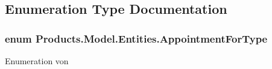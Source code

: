 \subsection{Enumeration Type Documentation}
\subsubsection[{\texorpdfstring{Appointment\+For\+Type}{AppointmentForType}}]{\setlength{\rightskip}{0pt plus 5cm}enum {\bf Products.\+Model.\+Entities.\+Appointment\+For\+Type}\hspace{0.3cm}{\ttfamily [strong]}}\hypertarget{namespace_products_1_1_model_1_1_entities_aefe1aa1a1f657c594489271d04959c2d}{}\label{namespace_products_1_1_model_1_1_entities_aefe1aa1a1f657c594489271d04959c2d}


Enumeration von 

